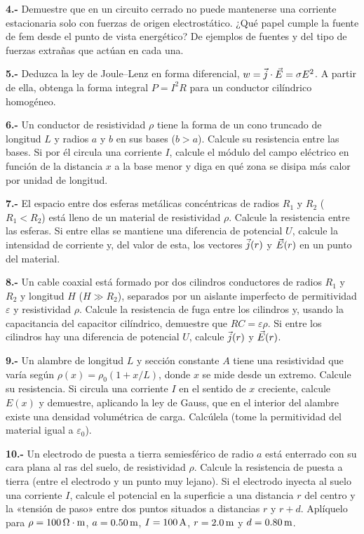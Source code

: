 \documentclass[11pt]{article}
\newcommand{\grupo}[1]{\par\medskip{\color{azul}\bfseries Grupo #1}\par\smallskip}
\newcommand{\p}[1]{\par\smallskip\textbf{#1.-} }
\begin{document}
\p{4} Demuestre que en un circuito cerrado no puede mantenerse una corriente estacionaria solo con fuerzas de origen electrostático. ¿Qué papel cumple la fuente de fem desde el punto de vista energético? De ejemplos de fuentes y del tipo de fuerzas extrañas que actúan en cada una.

\p{5} Deduzca la ley de Joule--Lenz en forma diferencial, $w=\vj\cdot\vE=\sigma E^2$. A partir de ella, obtenga la forma integral $P=I^2R$ para un conductor cilíndrico homogéneo.

\grupo{II}
\p{6} Un conductor de resistividad $\rho$ tiene la forma de un cono truncado de longitud $L$ y radios $a$ y $b$ en sus bases ($b>a$). Calcule su resistencia entre las bases. Si por él circula una corriente $I$, calcule el módulo del campo eléctrico en función de la distancia $x$ a la base menor y diga en qué zona se disipa más calor por unidad de longitud.

\p{7} El espacio entre dos esferas metálicas concéntricas de radios $R_1$ y $R_2$ ($R_1<R_2$) está lleno de un material de resistividad $\rho$. Calcule la resistencia entre las esferas. Si entre ellas se mantiene una diferencia de potencial $U$, calcule la intensidad de corriente y, del valor de esta, los vectores $\vj(r)$ y $\vE(r)$ en un punto del material.

\p{8} Un cable coaxial está formado por dos cilindros conductores de radios $R_1$ y $R_2$ y longitud $H$ ($H\gg R_2$), separados por un aislante imperfecto de permitividad $\varepsilon$ y resistividad $\rho$. Calcule la resistencia de fuga entre los cilindros y, usando la capacitancia del capacitor cilíndrico, demuestre que $RC=\varepsilon\rho$. Si entre los cilindros hay una diferencia de potencial $U$, calcule $\vj(r)$ y $\vE(r)$.

\p{9} Un alambre de longitud $L$ y sección constante $A$ tiene una resistividad que varía según $\rho(x)=\rho_0(1+x/L)$, donde $x$ se mide desde un extremo. Calcule su resistencia. Si circula una corriente $I$ en el sentido de $x$ creciente, calcule $E(x)$ y demuestre, aplicando la ley de Gauss, que en el interior del alambre existe una densidad volumétrica de carga. Calcúlela (tome la permitividad del material igual a $\varepsilon_0$).

\p{10} Un electrodo de puesta a tierra semiesférico de radio $a$ está enterrado con su cara plana al ras del suelo, de resistividad $\rho$. Calcule la resistencia de puesta a tierra (entre el electrodo y un punto muy lejano). Si el electrodo inyecta al suelo una corriente $I$, calcule el potencial en la superficie a una distancia $r$ del centro y la «tensión de paso» entre dos puntos situados a distancias $r$ y $r+d$. Aplíquelo para $\rho=100\ohm\cdot\mathrm{m}$, $a=0.50\uu{m}$, $I=100\uu{A}$, $r=2.0\uu{m}$ y $d=0.80\uu{m}$.
\end{document}
